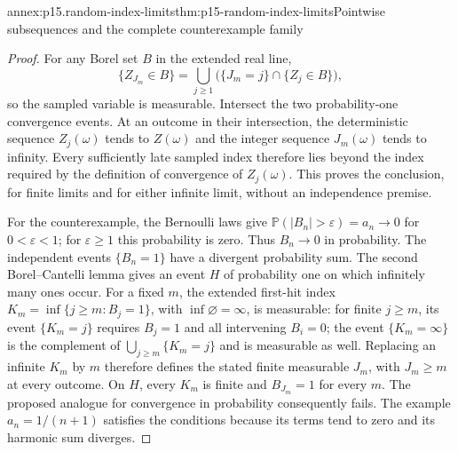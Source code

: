 \begin{annexitem}{annex:p15.random-index-limits}{thm:p15-random-index-limits}{Pointwise subsequences and the complete counterexample family}
\begin{proof}
For any Borel set \(B\) in the extended real line,
\[
 \{Z_{J_m}\in B\}
   =\bigcup_{j\geq1}\bigl(\{J_m=j\}\cap\{Z_j\in B\}\bigr),
\]
so the sampled variable is measurable. Intersect the two
probability-one convergence events. At an outcome in their intersection,
the deterministic sequence \(Z_j(\omega)\) tends to \(Z(\omega)\)
and the integer sequence \(J_m(\omega)\) tends to infinity.
Every sufficiently late sampled index therefore lies beyond the index
required by the definition of convergence of \(Z_j(\omega)\).
This proves the conclusion, for finite limits and for either infinite
limit, without an independence premise.

For the counterexample, the Bernoulli laws give
\(\mathbb P(|B_n|>\varepsilon)=a_n\to0\) for \(0<\varepsilon<1\);
for \(\varepsilon\geq1\) this probability is zero. Thus \(B_n\to0\)
in probability. The independent events \(\{B_n=1\}\) have a divergent
probability sum. The second Borel--Cantelli lemma gives an event
\(H\) of probability one on which infinitely many ones occur.
For a fixed \(m\), the extended first-hit index
\(K_m=\inf\{j\geq m:B_j=1\}\), with \(\inf\varnothing=\infty\),
is measurable: for finite \(j\geq m\), its event \(\{K_m=j\}\)
requires \(B_j=1\) and all intervening \(B_i=0\); the event
\(\{K_m=\infty\}\) is the complement of
\(\bigcup_{j\geq m}\{K_m=j\}\) and is measurable as well.
Replacing an infinite \(K_m\) by \(m\) therefore defines the stated
finite measurable \(J_m\), with \(J_m\geq m\) at every outcome.
On \(H\), every \(K_m\) is finite and \(B_{J_m}=1\) for every
\(m\). The proposed analogue for convergence in probability consequently
fails. The example \(a_n=1/(n+1)\) satisfies the conditions because
its terms tend to zero and its harmonic sum diverges.
\end{proof}
\end{annexitem}


